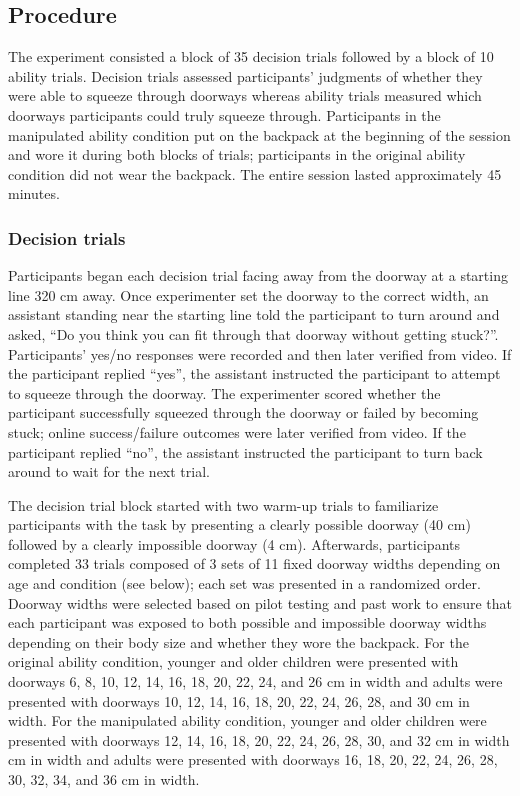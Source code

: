 \documentclass[a4paper,man,natbib,floatsintext,noextraspace]{apa6}
\begin{document}
\subsection{Procedure}

The experiment consisted a block of 35 decision trials followed by a block of 10 ability trials. Decision trials assessed participants’ judgments of whether they were able to squeeze through doorways whereas ability trials measured which doorways participants could truly squeeze through. Participants in the manipulated ability condition put on the backpack at the beginning of the session and wore it during both blocks of trials; participants in the original ability condition did not wear the backpack. The entire session lasted approximately 45 minutes. 

\subsubsection{Decision trials}

Participants began each decision trial facing away from the doorway at a starting line 320 cm away. Once experimenter set the doorway to the correct width, an assistant standing near the starting line told the participant to turn around and asked, “Do you think you can fit through that doorway without getting stuck?”. Participants’ yes/no responses were recorded and then later verified from video. If the participant replied “yes”, the assistant instructed the participant to attempt to squeeze through the doorway. The experimenter scored whether the participant successfully squeezed through the doorway or failed by becoming stuck; online success/failure outcomes were later verified from video. If the participant replied “no”, the assistant instructed the participant to turn back around to wait for the next trial.

The decision trial block started with two warm-up trials to familiarize participants with the task by presenting a clearly possible doorway (40 cm) followed by a clearly impossible doorway (4 cm). Afterwards, participants completed 33 trials composed of 3 sets of 11 fixed doorway widths depending on age and condition (see below); each set was presented in a randomized order. Doorway widths were selected based on pilot testing and past work \citep{Recal} to ensure that each participant was exposed to both possible and impossible doorway widths depending on their body size and whether they wore the backpack. For the original ability condition, younger and older children were presented with doorways 6, 8, 10, 12, 14, 16, 18, 20, 22, 24, and 26 cm in width and adults were presented with doorways 10, 12, 14, 16, 18, 20, 22, 24, 26, 28, and 30 cm in width. For the manipulated ability condition, younger and older children were presented with doorways 12, 14, 16, 18, 20, 22, 24, 26, 28, 30, and 32 cm in width cm in width and adults were presented with doorways 16, 18, 20, 22, 24, 26, 28, 30, 32, 34, and 36 cm in width. 
\end{document}
